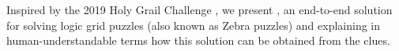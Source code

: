 Inspired by the 2019 Holy Grail Challenge \cite{}, we present \ourtool,  an end-to-end solution for solving logic grid puzzles (also known as Zebra puzzles) and explaining in human-understandable terms how this solution can be obtained from the clues. 




